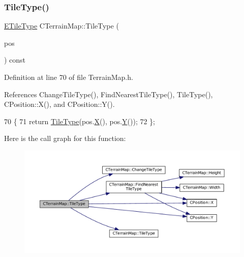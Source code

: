 \subsubsection{\texorpdfstring{Tile\+Type()}{TileType()}\hspace{0.1cm}{\footnotesize\ttfamily [2/2]}}
{\footnotesize\ttfamily \hyperlink{classCTerrainMap_aff2ab991e237269941416dd79d8871d4}{E\+Tile\+Type} C\+Terrain\+Map\+::\+Tile\+Type (\begin{DoxyParamCaption}\item[{const \hyperlink{classCPosition}{C\+Position} \&}]{pos }\end{DoxyParamCaption}) const\hspace{0.3cm}{\ttfamily [inline]}}



Definition at line 70 of file Terrain\+Map.\+h.



References Change\+Tile\+Type(), Find\+Nearest\+Tile\+Type(), Tile\+Type(), C\+Position\+::\+X(), and C\+Position\+::\+Y().


\begin{DoxyCode}
70                                                       \{
71             \textcolor{keywordflow}{return} \hyperlink{classCTerrainMap_a7e0e440467a09cb1c59e2bdbec01ccb4}{TileType}(pos.\hyperlink{classCPosition_a9a6b94d3b91df1492d166d9964c865fc}{X}(), pos.\hyperlink{classCPosition_a1aa8a30e2f08dda1f797736ba8c13a87}{Y}());
72         \};
\end{DoxyCode}
Here is the call graph for this function\+:\nopagebreak
\begin{figure}[H]
\begin{center}
\leavevmode
\includegraphics[width=350pt]{classCTerrainMap_a3a7229412b3391835dd6036439e5c6c0_cgraph}
\end{center}
\end{figure}
\hypertarget{classCTerrainMap_a34cb754aa9b26e85a73377159f2527d7}{}\label{classCTerrainMap_a34cb754aa9b26e85a73377159f2527d7} 
